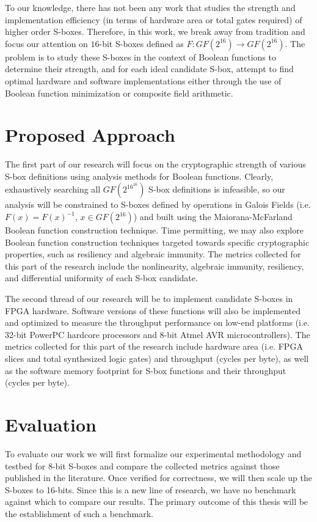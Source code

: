 \documentclass[10pt]{article}
\begin{document}
To our knowledge, there has not been any work that studies the strength and
implementation efficiency (in terms of hardware area or total gates required) of higher order
S-boxes. Therefore, in this work, we break away from tradition and focus our attention on $16$-bit
S-boxes defined as $F : GF(2^{16}) \to GF(2^{16})$. The problem is to study these S-boxes
in the context of Boolean functions to determine their strength, and for each ideal candidate
S-box, attempt to find optimal hardware and software implementations either through the use of Boolean
function minimization or composite field arithmetic.
\vspace{-1em}
\section{Proposed Approach}
The first part of our research will focus on the cryptographic strength of 
various S-box definitions using analysis methods for Boolean functions. Clearly, exhaustively searching
all $GF(2^{16^{16}})$ S-box definitions is infeasible, so our analysis will be constrained
to S-boxes defined by operations in Galois Fields (i.e. $F(x) = F(x)^{-1}$, $x \in GF(2^{16})$)
and built using the Maiorana-McFarland Boolean function construction technique. Time
permitting, we may also explore Boolean function construction techniques targeted towards specific
cryptographic properties, such as resiliency and algebraic immunity. 
The metrics collected for this part of the research include the nonlinearity,
algebraic immunity, resiliency, and differential uniformity of each S-box candidate. 

 
The second thread of our research will be to implement candidate S-boxes in FPGA hardware. Software versions
of these functions will also be implemented and optimized to measure the throughput performance
on low-end platforms (i.e. 32-bit PowerPC hardcore processors and 8-bit Atmel AVR microcontrollers). 
The metrics collected for this part of the research include hardware area (i.e.
FPGA slices and total synthesized logic gates) and throughput (cycles per byte), as well
as the software memory footprint for S-box functions and their throughput (cycles per byte).
\vspace{-1em}
\section{Evaluation}
To evaluate our work we will first formalize our experimental methodology and testbed for 8-bit S-boxes and 
compare the collected metrics against those published in the literature. Once verified for correctness,
we will then scale up the S-boxes to 16-bits. Since this is a new line of research, we have
no benchmark against which to compare our results. The primary outcome of this thesis will be 
the establishment of such a benchmark.
\end{document}

